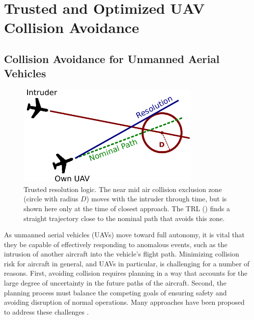 \chapter{Trusted and Optimized UAV Collision Avoidance}

\section{Collision Avoidance for Unmanned Aerial Vehicles} \label{sec:uavintro}

\begin{figure}
    \centering
    \includegraphics[height=5.0cm]{media/simple_trl.pdf}
    \caption[Trusted resolution logic]{Trusted resolution logic. The near mid air collision exclusion zone (circle with radius $D$) moves with the intruder through time, but is shown here only at the time of closest approach. The TRL () finds a straight trajectory close to the nominal path that avoids this zone.}
    \label{fig:trl}
\end{figure}

As unmanned aerial vehicles (UAVs) move toward full autonomy, it is vital that they be capable of effectively responding to anomalous events, such as the intrusion of another aircraft into the vehicle's flight path. Minimizing collision risk for aircraft in general, and UAVs in particular, is challenging for a number of reasons. First, avoiding collision requires planning in a way that accounts for the large degree of uncertainty in the future paths of the aircraft. Second, the planning process must balance the competing goals of ensuring safety and avoiding disruption of normal operations. Many approaches have been proposed to address these challenges \cite{JKK-LCY:00,HYO-MJK:15,RB-CF-HE:09,GH-RB-JM:11,HH-JJ-CM:10,AN-CM-GD:12,ST-MJK-LPK-TLP-JKK:10,MJK-JPC:11,MJK-JPC-LPK-TL:10,LPK-TL:09,HB-DH-MJK-WSL:12,JEH-MJK-WAO:13,EJR:14}.

